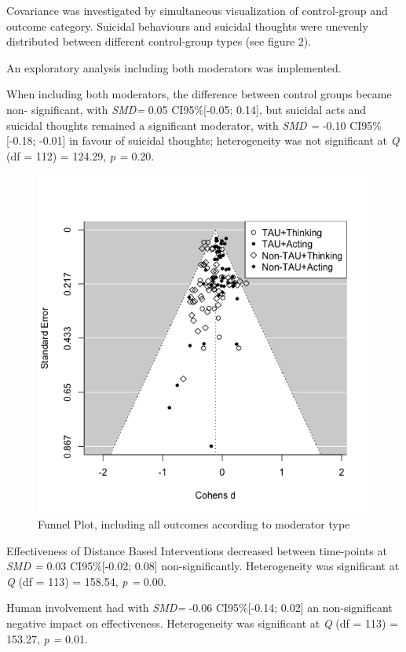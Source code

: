 \documentclass[
  english,
  man]{apa6}
\begin{document}
Covariance was investigated by simultaneous visualization of control-group and outcome category. Suicidal behaviours and suicidal thoughts were unevenly distributed between different control-group types (see figure 2).

An exploratory analysis including both moderators was implemented.

When including both moderators, the difference between control groups became non- significant, with \emph{SMD=} 0.05 CI95\%{[}-0.05; 0.14{]}, but suicidal acts and suicidal thoughts remained a significant moderator, with \emph{SMD =} -0.10 CI95\%{[}-0.18; -0.01{]} in favour of suicidal thoughts; heterogeneity was not significant at \emph{Q} (df = 112) = 124.29, \emph{p =} 0.20.

\begin{figure}
\centering
\includegraphics{01_Plots/Rplot2.png}
\caption{Funnel Plot, including all outcomes according to moderator type}
\end{figure}

Effectiveness of Distance Based Interventions decreased between time-points at \emph{SMD =} 0.03 CI95\%{[}-0.02; 0.08{]} non-significantly. Heterogeneity was significant at \emph{Q} (df = 113) = 158.54, \emph{p =} 0.00.

Human involvement had with \emph{SMD=} -0.06 CI95\%{[}-0.14; 0.02{]} an non-significant negative impact on effectiveness. Heterogeneity was significant at \emph{Q} (df = 113) = 153.27, \emph{p =} 0.01.
\end{document}
